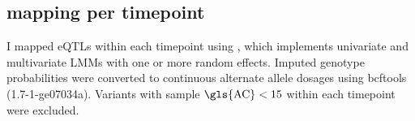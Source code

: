 
\subsection{ mapping per timepoint}

%
I mapped \glspl{eQTL} within each timepoint using  \autocite{lippert2014LIMIXGeneticAnalysis}, which implements univariate and multivariate \glspl{LMM} with one or more random effects.
Imputed genotype probabilities were converted to continuous alternate allele dosages using bcftools (1.7-1-ge07034a).
Variants with sample $\text{\gls{AC}} < 15$ within each timepoint were excluded.
%

